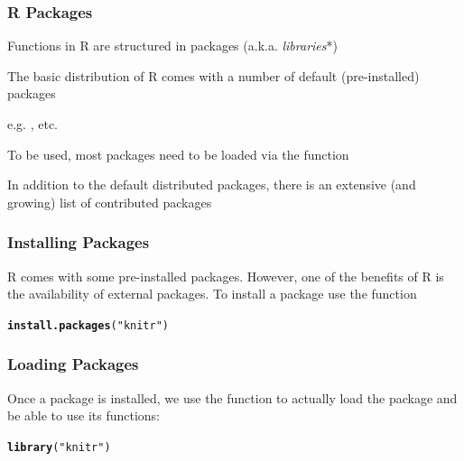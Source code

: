 \documentclass[12pt]{beamer}\usepackage[]{graphicx}\usepackage[]{color}
\makeatletter
\newcommand{\hlstr}[1]{\textcolor[rgb]{0.192,0.494,0.8}{#1}}%
\newcommand{\hlstd}[1]{\textcolor[rgb]{0.345,0.345,0.345}{#1}}%
\newcommand{\hlkwd}[1]{\textcolor[rgb]{0.737,0.353,0.396}{\textbf{#1}}}%
\newenvironment{kframe}{%
 \def\at@end@of@kframe{}%
 \ifinner\ifhmode%
  \def\at@end@of@kframe{\end{minipage}}%
  \begin{minipage}{\columnwidth}%
 \fi\fi%
 \def\FrameCommand##1{\hskip\@totalleftmargin \hskip-\fboxsep
 \colorbox{shadecolor}{##1}\hskip-\fboxsep
     \hskip-\linewidth \hskip-\@totalleftmargin \hskip\columnwidth}%
 \MakeFramed {\advance\hsize-\width
   \@totalleftmargin\z@ \linewidth\hsize
   \@setminipage}}%
 {\par\unskip\endMakeFramed%
 \at@end@of@kframe}
\newenvironment{knitrout}{}{} %
\makeatother
\begin{document}

\begin{frame}
\frametitle{R Packages}

\bbi
  \item Functions in R are structured in packages (a.k.a. \textit{libraries}*)
  \item The basic distribution of R comes with a number of default (pre-installed) packages
  \item e.g. , etc.
  \item To be used, most packages need to be loaded via the function 
  \item In addition to the default distributed packages, there is an extensive (and growing) list of contributed packages
\ei

\end{frame}


\begin{frame}[fragile]
\frametitle{Installing Packages}

R comes with some pre-installed packages. However, one of the benefits of R is the availability of external packages. To install a package use the function {\hilit {}}
\begin{knitrout}\footnotesize
{}\color{fgcolor}\begin{kframe}
\begin{alltt}
\hlkwd{install.packages}\hlstd{(}\hlstr{"knitr"}\hlstd{)}
\end{alltt}
\end{kframe}
\end{knitrout}

\end{frame}


\begin{frame}[fragile]
\frametitle{Loading Packages}

Once a package is installed, we use the function {\hilit {}} to actually load the package and be able to use its functions:
\begin{knitrout}\footnotesize
{}\color{fgcolor}\begin{kframe}
\begin{alltt}
\hlkwd{library}\hlstd{(}\hlstr{"knitr"}\hlstd{)}
\end{alltt}
\end{kframe}
\end{knitrout}

\end{frame}
\end{document}
